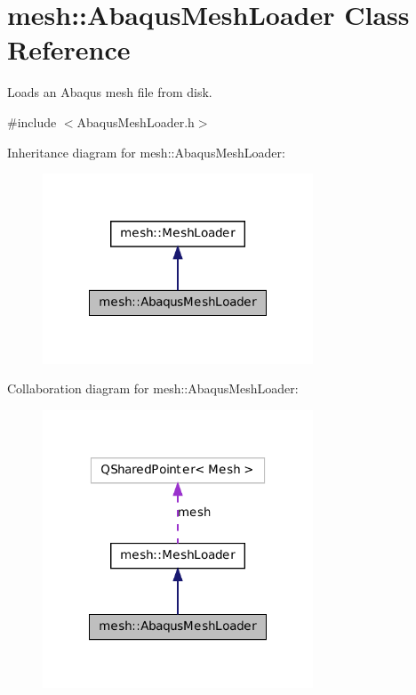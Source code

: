 \hypertarget{classmesh_1_1_abaqus_mesh_loader}{
\section{mesh::AbaqusMeshLoader Class Reference}
\label{classmesh_1_1_abaqus_mesh_loader}
}


Loads an Abaqus mesh file from disk.  




{\ttfamily \#include $<$AbaqusMeshLoader.h$>$}



Inheritance diagram for mesh::AbaqusMeshLoader:\nopagebreak
\begin{figure}[H]
\begin{center}
\leavevmode
\includegraphics[width=228pt]{classmesh_1_1_abaqus_mesh_loader__inherit__graph}
\end{center}
\end{figure}


Collaboration diagram for mesh::AbaqusMeshLoader:\nopagebreak
\begin{figure}[H]
\begin{center}
\leavevmode
\includegraphics[width=228pt]{classmesh_1_1_abaqus_mesh_loader__coll__graph}
\end{center}
\end{figure}
